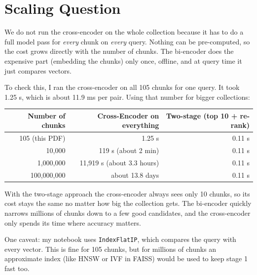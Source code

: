\documentclass[11pt,a4paper]{article}
\begin{document}
\section{Scaling Question}

We do not run the cross-encoder on the whole collection because it has to do a full model pass for
\emph{every} chunk on \emph{every} query. Nothing can be pre-computed, so the cost grows directly with the number
of chunks. The bi-encoder does the expensive part (embedding the chunks) only once, offline, and at query time it
just compares vectors.

To check this, I ran the cross-encoder on all 105 chunks for one query. It took 1.25 s, which is about 11.9 ms per
pair. Using that number for bigger collections:

\begin{center}
\begin{tabular}{rrr}
\toprule
\textbf{Number of chunks} & \textbf{Cross-Encoder on everything} & \textbf{Two-stage (top 10 + re-rank)} \\
\midrule
105 (this PDF) & 1.25 s                  & 0.11 s \\
10,000         & 119 s (about 2 min)     & 0.11 s \\
1,000,000      & 11,919 s (about 3.3 hours) & 0.11 s \\
100,000,000    & about 13.8 days         & 0.11 s \\
\bottomrule
\end{tabular}
\end{center}

With the two-stage approach the cross-encoder always sees only 10 chunks, so its cost stays the same no matter how
big the collection gets. The bi-encoder quickly narrows millions of chunks down to a few good candidates, and the
cross-encoder only spends its time where accuracy matters.

One caveat: my notebook uses \texttt{IndexFlatIP}, which compares the query with every vector. This is fine for 105
chunks, but for millions of chunks an approximate index (like HNSW or IVF in FAISS) would be used to keep stage 1
fast too.
\end{document}
